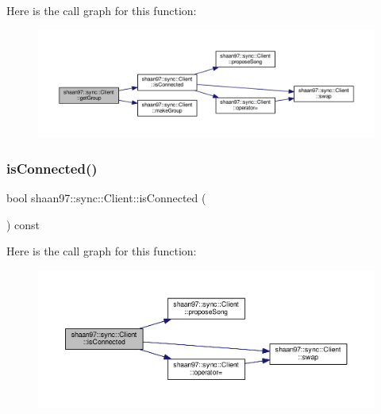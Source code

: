 Here is the call graph for this function\+:\nopagebreak
\begin{figure}[H]
\begin{center}
\leavevmode
\includegraphics[width=350pt]{classshaan97_1_1sync_1_1_client_abf8af45f2a8b6bf674357b6fc44fe3cc_cgraph}
\end{center}
\end{figure}
\mbox{\label{classshaan97_1_1sync_1_1_client_a4367779edf080f835087e07b35fa6a38}} 
\subsubsection{\texorpdfstring{is\+Connected()}{isConnected()}}
{\footnotesize\ttfamily bool shaan97\+::sync\+::\+Client\+::is\+Connected (\begin{DoxyParamCaption}{ }\end{DoxyParamCaption}) const\hspace{0.3cm}{\ttfamily [inline]}}

Here is the call graph for this function\+:\nopagebreak
\begin{figure}[H]
\begin{center}
\leavevmode
\includegraphics[width=350pt]{classshaan97_1_1sync_1_1_client_a4367779edf080f835087e07b35fa6a38_cgraph}
\end{center}
\end{figure}
\mbox{\label{classshaan97_1_1sync_1_1_client_afa6eb46eb9710b7ee9bbfaec0f70249b}} 
